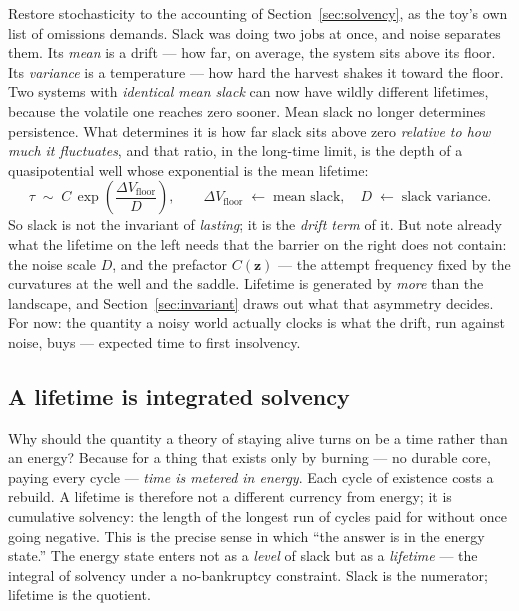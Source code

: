 \documentclass[11pt]{article}
\theoremstyle{plain}
\theoremstyle{definition}
\begin{document}
Restore stochasticity to the accounting of Section~\ref{sec:solvency}, as the toy's own list of omissions demands. Slack was doing two jobs at once, and noise separates them. Its \emph{mean} is a drift --- how far, on average, the system sits above its floor. Its \emph{variance} is a temperature --- how hard the harvest shakes it toward the floor. Two systems with \emph{identical mean slack} can now have wildly different lifetimes, because the volatile one reaches zero sooner. Mean slack no longer determines persistence. What determines it is how far slack sits above zero \emph{relative to how much it fluctuates}, and that ratio, in the long-time limit, is the depth of a quasipotential well whose exponential is the mean lifetime:
\begin{equation}
\tau \;\sim\; C\,\exp\!\left(\frac{\Delta V_{\text{floor}}}{D}\right), \qquad
\Delta V_{\text{floor}} \;\longleftarrow\; \text{mean slack}, \quad
D \;\longleftarrow\; \text{slack variance.}
\label{eq:kramers}
\end{equation}
So slack is not the invariant of \emph{lasting}; it is the \emph{drift term} of it. But note already what the lifetime on the left needs that the barrier on the right does not contain: the noise scale $D$, and the prefactor $C(\mathbf z)$ --- the attempt frequency fixed by the curvatures at the well and the saddle. Lifetime is generated by \emph{more} than the landscape, and Section~\ref{sec:invariant} draws out what that asymmetry decides. For now: the quantity a noisy world actually clocks is what the drift, run against noise, buys --- expected time to first insolvency.

\subsection{A lifetime is integrated solvency}

Why should the quantity a theory of staying alive turns on be a time rather than an energy? Because for a thing that exists only by burning --- no durable core, paying every cycle --- \emph{time is metered in energy}. Each cycle of existence costs a rebuild. A lifetime is therefore not a different currency from energy; it is cumulative solvency: the length of the longest run of cycles paid for without once going negative. This is the precise sense in which ``the answer is in the energy state.'' The energy state enters not as a \emph{level} of slack but as a \emph{lifetime} --- the integral of solvency under a no-bankruptcy constraint. Slack is the numerator; lifetime is the quotient.
\end{document}
